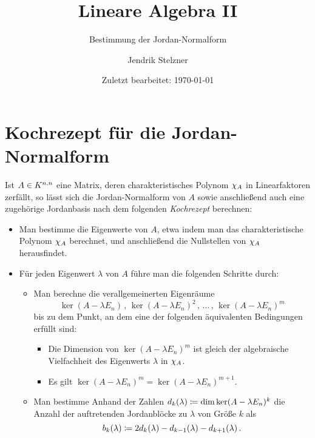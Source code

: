 \documentclass[a4paper,10pt,numbers = noenddot]{scrartcl}
\title{Lineare Algebra II}
\subtitle{Bestimmung der Jordan-Normalform}
\author{Jendrik Stelzner}
\date{Zuletzt bearbeitet: \today}
\begin{document}
\maketitle





\section*{Kochrezept für die Jordan-Normalform}

Ist $A \in \matrices{n}{K}$ eine Matrix, deren charakteristisches Polynom $\charpol{A}$ in Linearfaktoren zerfällt, so lässt sich die Jordan-Normalform von $A$ sowie anschließend auch eine zugehörige Jordanbasis nach dem folgenden \emph{Kochrezept} berechnen:

\begin{itemize}
  \item
    Man bestimme die Eigenwerte von $A$, etwa indem man das charakteristische Polynom $\charpol{A}$ berechnet, und anschließend die Nullstellen von $\charpol{A}$ herausfindet.
    
  \item
    Für jeden Eigenwert $\lambda$ von $A$ führe man die folgenden Schritte durch:
    \begin{itemize}
      \item
        Man berechne die verallgemeinerten Eigenräume
        \[
          \ker (A - \lambda E_n)\,,\,
          \ker (A - \lambda E_n)^2\,,\,
          \dotsc\,,\,
          \ker (A - \lambda E_n)^m
        \]
        bis zu dem Punkt, an dem eine der folgenden äquivalenten Bedingungen erfüllt sind:
        \begin{itemize}
          \item
            Die Dimension von $\ker (A - \lambda E_n)^m$ ist gleich der algebraische Vielfachheit des Eigenwerts $\lambda$ in $\charpol{A}$.
          \item
            Es gilt $\ker (A - \lambda E_n)^m = \ker (A - \lambda E_n)^{m+1}$.
        \end{itemize}
      \item
        Man bestimme Anhand der Zahlen $d_k(\lambda) \defined \dim \ker (A - \lambda E_n)^k$ die Anzahl der auftretenden Jordanblöcke zu $\lambda$ von Größe $k$ als
        \[
                    b_k(\lambda)
          \defined  2 d_k(\lambda) - d_{k-1}(\lambda) - d_{k+1}(\lambda) \,.
        \]
    \end{itemize}
\end{itemize}
\end{document}
